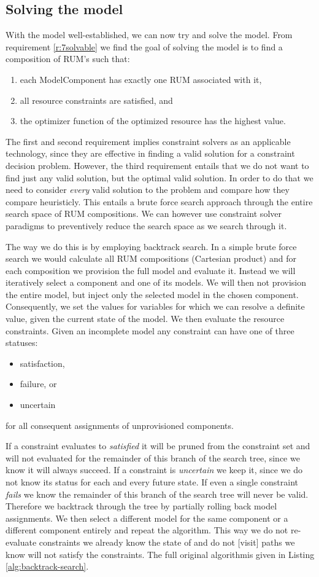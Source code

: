 \subsection{Solving the model}
With the model well-established, we can now try and solve the model. From requirement \ref{r:7solvable} we find the goal of solving the model is to find a composition of RUM's such that:
\begin{enumerate}
\item each ModelComponent has exactly one RUM associated with it,
\item all resource constraints are satisfied, and
\item the optimizer function of the optimized resource has the highest value.
\end{enumerate}
The first and second requirement implies constraint solvers as an applicable technology, since they are effective in finding a valid solution for a constraint decision problem. However, the third requirement entails that we do not want to find just any valid solution, but the optimal valid solution. In order to do that we need to consider \emph{every} valid solution to the problem and compare how they compare heuristicly. This entails a brute force search approach through the entire search space of RUM compositions. We can however use constraint solver paradigms to preventively reduce the search space as we search through it.

The way we do this is by employing backtrack search. In a simple brute force search we would calculate all RUM compositions (Cartesian product) and for each composition we provision the full model and evaluate it. Instead we will iteratively select a component and one of its models. We will then not provision the entire model, but inject only the selected model in the chosen component. Consequently, we set the values for variables for which we can resolve a definite value, given the current state of the model. We then evaluate the resource constraints. Given an incomplete model any constraint can have one of three statuses:
\begin{itemize}
\item satisfaction,
\item failure, or
\item uncertain
\end{itemize}
for all consequent assignments of unprovisioned components.

If a constraint evaluates to \emph{satisfied} it will be pruned from the constraint set and will not evaluated for the remainder of this branch of the search tree, since we know it will always succeed. If a constraint is \emph{uncertain} we keep it, since we do not know its status for each and every future state. If even a single constraint \emph{fails} we know the remainder of this branch of the search tree will never be valid. Therefore we backtrack through the tree by partially rolling back model assignments. We then select a different model for the same component or a different component entirely and repeat the algorithm. This way we do not re-evaluate constraints we already know the state of and do not [visit] paths we know will not satisfy the constraints. The full original algorithmis given in Listing \ref{alg:backtrack-search}. 

